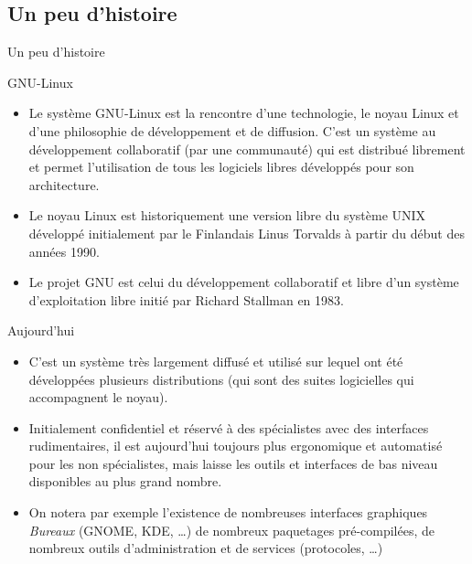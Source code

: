 \subsection{Un peu d'histoire}
\begin{frame}{Un peu d'histoire}
  \begin{block}{GNU-Linux}
    \begin{itemize}
    \item Le système GNU-Linux est la rencontre d'une technologie, le
      noyau Linux et d'une philosophie de développement et de
      diffusion. C'est un système au développement collaboratif (par une
      communauté) qui est distribué librement et permet l'utilisation de
      tous les logiciels libres développés pour son architecture.
    \item Le noyau Linux est historiquement une version libre du système
      UNIX développé initialement par le Finlandais Linus Torvalds à
      partir du début des années 1990.
    \item Le projet GNU est celui du développement collaboratif et libre
      d'un système d'exploitation libre initié par Richard Stallman en
      1983.
    \end{itemize}
  \end{block}
  \begin{block}{Aujourd'hui}
    \begin{itemize}
    \item C'est un système très largement diffusé et utilisé sur lequel
      ont été développées plusieurs distributions (qui sont des suites
      logicielles qui accompagnent le noyau).
    \item Initialement confidentiel et réservé à des spécialistes avec
      des interfaces rudimentaires, il est aujourd'hui toujours plus
      ergonomique et automatisé pour les non spécialistes, mais laisse
      les outils et interfaces de bas niveau disponibles au plus grand
      nombre.
    \item On notera par exemple l'existence de nombreuses interfaces
      graphiques \textit{Bureaux} (GNOME, KDE, \dots) de nombreux
      paquetages pré-compilées, de nombreux outils d'administration et
      de services (protocoles, \dots)
    \end{itemize}
  \end{block}
  
\end{frame}
